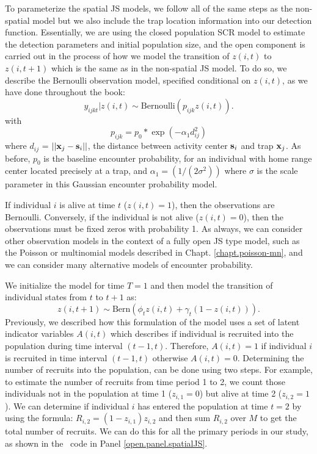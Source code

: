 To parameterize the spatial JS models, we follow all of the same steps
as the non-spatial model but we also include the trap location information into our
detection function.  Essentially, we are using the closed population SCR model to estimate
the detection parameters and initial population size,
and the open component is carried out in the process of how we model the transition
of $z(i,t)$ to $z(i, t+1)$ which is the same as in the non-spatial JS model.
To do so, we describe the Bernoulli observation model,
specified conditional on $z(i,t)$, as we have done throughout the book:
\[
  y_{ijkt}|z(i,t) \sim
\mbox{Bernoulli}(p_{ijk} z(i,t)).
\]
with
\begin{equation}
p_{ijk} = p_{0}*\exp(-\alpha_{1} d_{ij}^2)
\label{scr0.eq.norm}
\end{equation}
where $d_{ij}$ = $||{\bf x}_{j}-{\bf s}_{i}||$, the distance between
activity center ${\bf s}_{i}$ and trap ${\bf x}_{j}$. As before,
$p_{0}$ is the baseline encounter probability, for an individual with
home range center located precisely at a trap, and $\alpha_{1} =
(1/(2\sigma^2))$ where $\sigma$ is the scale parameter in
this Gaussian encounter probability model. 

If individual $i$ is alive at time $t$ ($z(i,t)=1$), then the
observations are Bernoulli.  Conversely, if the individual is
not alive ($z(i,t)=0$), then the observations must be fixed zeros with
probability 1.  As always, we can consider other observation models in
the context of a fully open JS type model, such as the
Poisson or multinomial models described
in Chapt. \ref{chapt.poisson-mn}, and we can consider many alternative
models of encounter probability.

We initialize the
model for time $T=1$
and then model the transition of individual states from
$t$ to $t+1$ as:
\[
 z(i,t+1) \sim \mbox{Bern}( \phi_t z(i,t)  + \gamma_t (1-z(i,t)) ).
\]
Previously, we described how this formulation of the model uses a set
of latent indicator variables $A(i,t)$ which describes if individual
is recruited into the population during time interval $(t-1, t)$.  Therefore,
$A(i,t) = 1$ if individual $i$ is recruited in time interval $(t-1,
t)$ otherwise $A(i,t)=0$.  Determining the number of recruits into the
population,
can be done using two steps.  
For example, to estimate the number of recruits from time period 1 to 2, we count those
individuals not in the population at time 1 ($z_{i,1} = 0$) but alive at time 2 ($z_{i,2} = 1$).
We can determine if individual $i$ has entered the population at time $t=2$ by using the formula:
 $R_{i,2}=(1-z_{i,1})z_{i,2}$ and then sum
$R_{i,2}$ over $M$ to get the total number of recruits.
We can do this for all the primary periods in our study,
as shown
in the \jags~code in Panel \ref{open.panel.spatialJS}.


